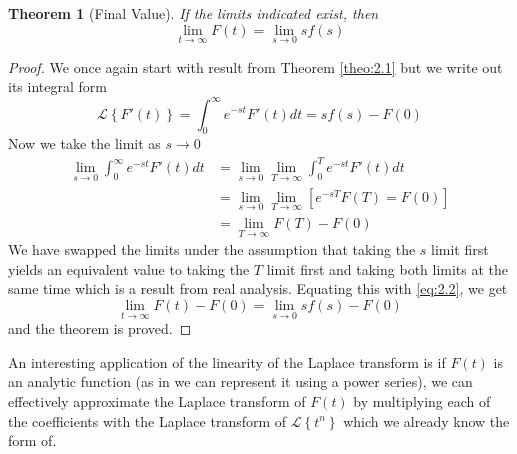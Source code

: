\documentclass{report}
\newtheorem{theorem}{Theorem}[chapter]
\theoremstyle{definition}
\theoremstyle{remark}
\newcommand{\lapt}[1]{\mathscr{L}\left\{ #1\right\}}
\begin{document}
\begin{theorem}[Final Value]
    If the limits indicated exist, then 
    \begin{equation*}
        \lim_{t\rightarrow \infty} F(t) = \lim_{s\rightarrow 0}sf(s)
    \end{equation*}
\end{theorem}
\begin{proof}
    We once again start with result from Theorem \ref{theo:2.1} but we write out its integral form
    \begin{equation}
        \lapt{F'(t) } = \int^\infty_0e^{-st}F'(t)dt = sf(s) - F(0) \label{eq:2.2}
    \end{equation}
    Now we take the limit as $s\rightarrow 0$
    \begin{equation*}
        \begin{split}
            \lim_{s\rightarrow 0} \int^\infty_0e^{-st}F'(t)dt &= \lim_{s\rightarrow0} \lim_{T\rightarrow \infty} \int^T_0e^{-st}F'(t)dt\\
            &= \lim_{s\rightarrow0} \lim_{T\rightarrow \infty} [e^{-sT}F(T) = F(0)] \\
            &= \lim_{T\rightarrow \infty} F(T) - F(0)
        \end{split}
    \end{equation*}
    We have swapped the limits under the assumption that taking the $s$ limit first yields an equivalent value to taking the $T$ limit first and taking both limits at the same time which is a result from real analysis. Equating this with \eqref{eq:2.2}, we get 
    \begin{equation*}
        \lim_{t\rightarrow \infty} F(t) - F(0) = \lim_{s\rightarrow 0} sf(s) - F(0)
    \end{equation*}
    and the theorem is proved.
\end{proof}

An interesting application of the linearity of the Laplace transform is if $F(t)$ is an analytic function (as in we can represent it using a power series), we can effectively approximate the Laplace transform of $F(t)$ by multiplying each of the coefficients with the Laplace transform of $\lapt{t^n}$ which we already know the form of.
\end{document}
